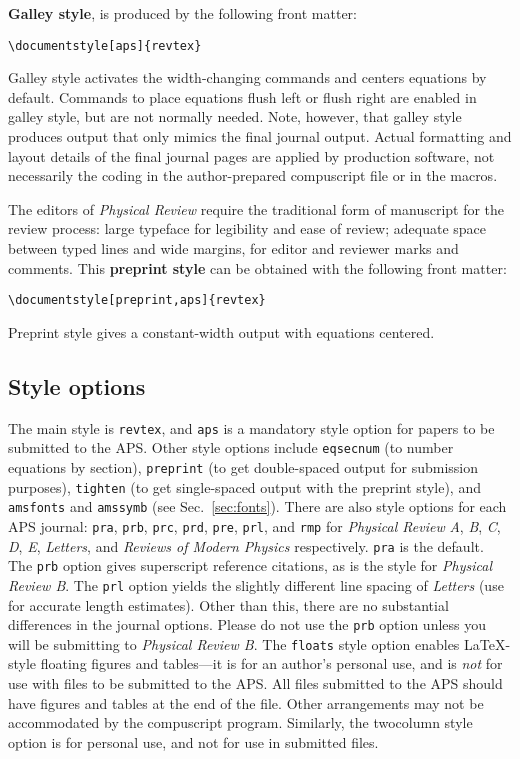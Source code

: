 {\bf Galley style}, is produced by the following front matter:
\begin{verbatim}
\documentstyle[aps]{revtex}

\end{verbatim}
Galley style activates the width-changing commands and centers equations by
default. Commands to place equations flush left or flush right are enabled
in galley style, but are not normally needed. Note, however, that
galley style produces output that only mimics the final journal
output. Actual formatting and layout details of the final journal
pages are applied by production software, not necessarily the coding
in the author-prepared compuscript file or in the \REVTeX{} macros. 

The editors of {\em Physical Review\/} require the traditional form of
manuscript for the review process: large typeface for legibility and ease
of review; adequate space between typed lines and wide margins, for editor
and reviewer marks and comments. This {\bf preprint style} can be obtained
with the following front matter:
\begin{verbatim}
\documentstyle[preprint,aps]{revtex}

\end{verbatim}
Preprint style gives a constant-width output with equations centered.

\subsection{Style options}

The main style is \verb+revtex+, and \verb+aps+ is a mandatory style option
for papers to be submitted to the APS. Other style options include
\verb+eqsecnum+ (to number equations by section), \verb+preprint+ (to get
double-spaced output for submission purposes), \verb+tighten+ (to get
single-spaced output with the preprint style), and \verb+amsfonts+ and
\verb+amssymb+ (see Sec.\ \ref{sec:fonts}). There are also style options
for each APS journal: \verb+pra+, \verb+prb+, \verb+prc+, \verb+prd+,
\verb+pre+, \verb+prl+, and \verb+rmp+ for {\it Physical Review\/} {\it A}, {\it B},
{\it C}, {\it D}, {\it E}, {\it Letters}, and {\it Reviews of Modern
Physics} respectively. \verb+pra+ is
the default. The \verb+prb+ option gives superscript reference citations,
as is the style for {\it Physical Review B}. The \verb+prl+ option yields
the slightly different line spacing of {\em Letters\/} (use for accurate
length estimates). Other than this, there are no substantial differences in
the journal options. Please do not use the \verb+prb+ option unless you
will be submitting to {\it Physical Review B}. The \verb+floats+ style
option enables \LaTeX{}-style floating figures and tables---it is for an
author's personal use, and is {\it not\/} for use with files to be
submitted to the APS. All files submitted to the APS should have figures
and tables at the end of the file. Other arrangements may not be
accommodated by the compuscript program. Similarly, the twocolumn
style option is for personal use, and not for use in submitted files. 


